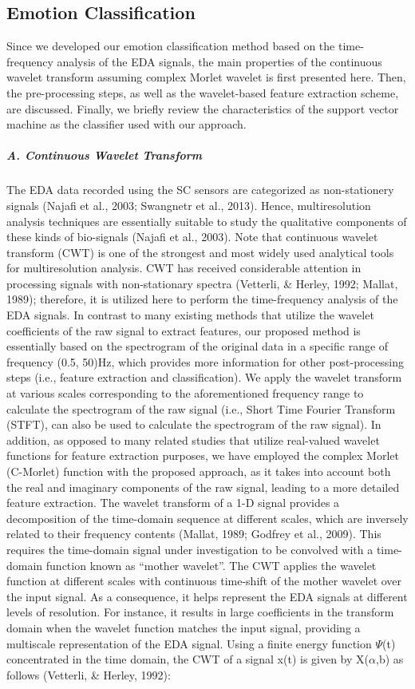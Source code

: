 \subsection{Emotion Classification}
Since we developed our emotion classification method based on the time-frequency analysis of the
EDA signals, the main properties of the continuous wavelet transform assuming complex Morlet
wavelet is first presented here. Then, the pre-processing steps, as well as the wavelet-based
feature extraction scheme, are discussed. Finally, we briefly review the characteristics of the
support vector machine as the classifier used with our approach.\\

\subparagraph{A. Continuous Wavelet Transform}
The EDA data recorded using the SC sensors are categorized as non-stationery signals 
(Najafi et al., 2003; Swangnetr et al., 2013). Hence, multiresolution analysis 
techniques are essentially suitable to study the qualitative components of these 
kinds of bio-signals (Najafi et al., 2003).  Note that continuous wavelet transform 
(CWT) is one of the strongest and most widely used analytical tools for multiresolution 
analysis. CWT has received considerable attention in processing signals with 
non-stationary spectra (Vetterli, \& Herley, 1992; Mallat, 1989); therefore, it is 
utilized here to perform the time-frequency analysis of the EDA signals. In contrast 
to many existing methods that utilize the wavelet coefficients of the raw signal to 
extract features, our proposed method is essentially based on the spectrogram of the 
original data in a specific range of frequency (0.5, 50)Hz, which provides more 
information for other post-processing steps (i.e., feature extraction and classification).
We apply the wavelet transform at various scales corresponding to the 
aforementioned frequency range to calculate the spectrogram of the raw signal 
(i.e., Short Time Fourier Transform (STFT), can also be used to calculate the 
spectrogram of the raw signal). In addition, as opposed to many related studies 
that utilize real-valued wavelet functions for feature extraction purposes, we have 
employed the complex Morlet (C-Morlet) function with the proposed approach, as it 
takes into account both the real and imaginary components of the raw signal, leading 
to a more detailed feature extraction.
The wavelet transform of a 1-D signal provides a decomposition of the time-domain 
sequence at different scales, which are inversely related to their frequency contents 
(Mallat, 1989; Godfrey et al., 2009). This requires the time-domain signal under 
investigation to be convolved with a time-domain function known as “mother wavelet”. 
The CWT applies the wavelet function at different scales with continuous time-shift 
of the mother wavelet over the input signal. As a consequence, it helps represent 
the EDA signals at different levels of resolution. For instance, it results in large 
coefficients in the transform domain when the wavelet function matches the input 
signal, providing a multiscale representation of the EDA signal.
Using a finite energy function $\Psi$(t) concentrated in the time domain, the CWT of 
a signal x(t) is given by X($\alpha$,b) as follows (Vetterli, \& Herley, 1992):

